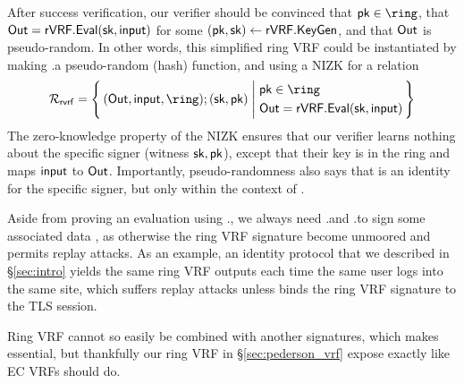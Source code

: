 After success verification, our verifier should be convinced that $\pk \in \ring$, that
${\mathsf{Out}} = {\mathsf{rVRF}}.{\mathsf{Eval}}(\mathsf{sk},\mathsf{input})$ for some $(\mathsf{pk},\mathsf{sk}) \leftarrow {\ensuremath{\mathsf{rVRF}}}.{\mathsf{KeyGen}}$,
and that ${\mathsf{Out}}$ is pseudo-random.
In other words, this simplified ring VRF could be instantiated by making
\rVRF.\Eval a pseudo-random (hash) function, and using a NIZK for a relation
\vspace{-3mm}
$$ \rel_{\mathsf{rvrf}} = \Setst{ (\Out, \msg, \ring);(\sk,\pk)}{
	\eprint{
		(\pk,\sk) \leftarrow \rVRF.\KeyGen, \quad %
		\pk \in \ring, \quad
		\Out = \rVRF.\Eval(\sk,\msg)
	}{
		\begin{aligned}
			& \pk \in \ring \\
			& \Out = \rVRF.\Eval(\sk,\msg)
		\end{aligned}
	}
} $$
The zero-knowledge property of the NIZK ensures that our verifier learns nothing about the specific
signer (witness $ \mathsf{sk},\mathsf{pk} $), except that their key is in the ring and maps $\mathsf{input}$ to ${\mathsf{Out}}$.
Importantly, pseudo-randomness also says that \Out is an identity
for the specific signer, but only within the context of \msg.


Aside from proving an evaluation using \rVRF.\Eval, 
we always need \rVRF.\Sign and \rVRF.\Verify to sign some associated data \aux,
as otherwise the ring VRF signature become unmoored and permits replay attacks.
%
As an example, an identity protocol that we described in \S\ref{sec:intro}
yields the same ring VRF outputs each time the same user logs into the
same site, which suffers replay attacks unless \aux binds the
ring VRF signature to the TLS session.


Ring VRF cannot so easily be combined with another signatures, which
makes \aux essential,%
but thankfully our ring VRF in \S\ref{sec:pederson_vrf} expose \aux exactly like EC VRFs should do.%

